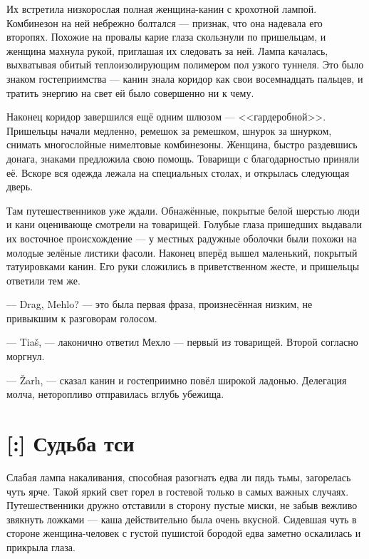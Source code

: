 Их встретила низкорослая полная женщина-канин с крохотной лампой.
Комбинезон на ней небрежно болтался --- признак, что она надевала его второпях.
Похожие на провалы карие глаза скользнули по пришельцам, и женщина махнула рукой, приглашая их следовать за ней.
Лампа качалась, выхватывая обитый теплоизолирующим полимером пол узкого туннеля.
Это было знаком гостеприимства --- канин знала коридор как свои восемнадцать пальцев, и тратить энергию на свет ей было совершенно ни к чему.

Наконец коридор завершился ещё одним шлюзом --- <<гардеробной>>.
Пришельцы начали медленно, ремешок за ремешком, шнурок за шнурком, снимать многослойные нимелтовые комбинезоны.
Женщина, быстро раздевшись донага, знаками предложила свою помощь.
Товарищи с благодарностью приняли её.
Вскоре вся одежда лежала на специальных столах, и открылась следующая дверь.

Там путешественников уже ждали.
Обнажённые, покрытые белой шерстью люди и кани оценивающе смотрели на товарищей.
Голубые глаза пришедших выдавали их восточное происхождение --- у местных радужные оболочки были похожи на молодые зелёные листики фасоли.
Наконец вперёд вышел маленький, покрытый татуировками канин.
Его руки сложились в приветственном жесте, и пришельцы ответили тем же.

--- Drag\FM, Mehlo? --- это была первая фраза, произнесённая низким, не привыкшим к разговорам голосом.

--- Tia\v{s}\FM, --- лаконично ответил Мехло --- первый из товарищей.
Второй согласно моргнул.

--- \v{Z}arh\FM, --- сказал канин и гостеприимно повёл широкой ладонью.
Делегация молча, неторопливо отправилась вглубь убежища.

\section{[:] Судьба тси}

Слабая лампа накаливания, способная разогнать едва ли пядь тьмы, загорелась чуть ярче.
Такой яркий свет горел в гостевой только в самых важных случаях.
Путешественники дружно отставили в сторону пустые миски, не забыв вежливо звякнуть ложками --- каша действительно была очень вкусной.
Сидевшая чуть в стороне женщина-человек с густой пушистой бородой едва заметно оскалилась и прикрыла глаза.

